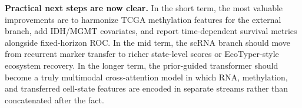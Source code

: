 \textbf{Practical next steps are now clear.} In the short term, the most valuable improvements are to harmonize TCGA methylation features for the external branch, add IDH/MGMT covariates, and report time-dependent survival metrics alongside fixed-horizon ROC. In the mid term, the scRNA branch should move from recurrent marker transfer to richer state-level scores or EcoTyper-style ecosystem recovery. In the longer term, the prior-guided transformer should become a truly multimodal cross-attention model in which RNA, methylation, and transferred cell-state features are encoded in separate streams rather than concatenated after the fact.
